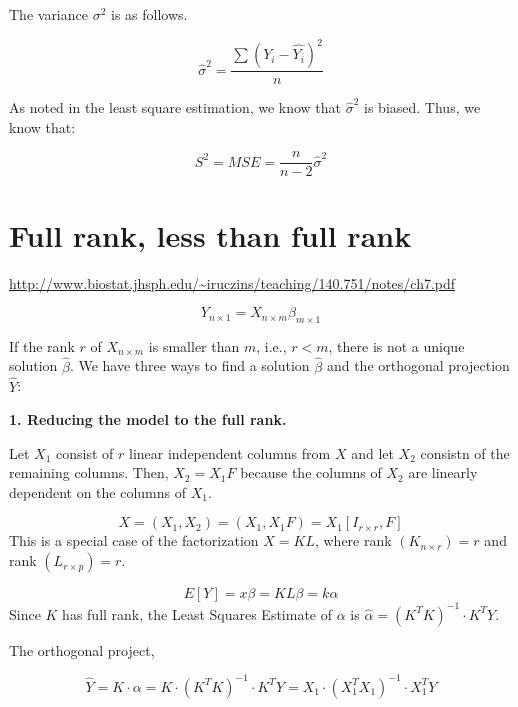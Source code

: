 \documentclass[]{book}
\begin{document}
The variance \(\sigma^2\) is as follows.

\[\hat{\sigma}^2=\frac{\sum(Y_i-\hat{Y_i})^2}{n}\]

As noted in the least square estimation, we know that \(\hat{\sigma}^2\) is biased. Thus, we know that:

\[S^2=MSE=\frac{n}{n-2}\hat{\sigma}^2\]

\hypertarget{full-rank-less-than-full-rank}{%
\section{Full rank, less than full rank}\label{full-rank-less-than-full-rank}}

\url{http://www.biostat.jhsph.edu/~iruczins/teaching/140.751/notes/ch7.pdf}

\[Y_{n \times 1}=X_{n\times m}\beta_{m \times 1}\]

If the rank \(r\) of \(X_{n \times m}\) is smaller than \(m\), i.e., \(r<m\), there is not a unique solution \(\hat{\beta}\). We have three ways to find a solution \(\hat{\beta}\) and the orthogonal projection \(\hat{Y}\):

\textbf{1. Reducing the model to the full rank.}

Let \(X_1\) consist of \(r\) linear independent columns from \(X\) and let \(X_2\) consistn of the remaining columns. Then, \(X_2=X_1F\) because the columns of \(X_2\) are linearly dependent on the columns of \(X_1\).

\[X=(X_1, X_2)=(X_1, X_1F)=X_1[I_{r\times r}, F]\]
This is a special case of the factorization \(X=KL\), where rank \((K_{n \times r})=r\) and rank \((L_{r\times p})=r\).

\[E[Y]=x\beta=KL\beta=k\alpha\]
Since \(K\) has full rank, the Least Squares Estimate of \(\alpha\) is \(\hat{\alpha}=(K^T K)^{-1} \cdot K^TY\).

The orthogonal project,

\[\hat{Y}=K\cdot \alpha=K \cdot(K^T K)^{-1} \cdot K^TY=X_1 \cdot(X_1^TX_1)^{-1}\cdot X_1^TY\]
\end{document}
